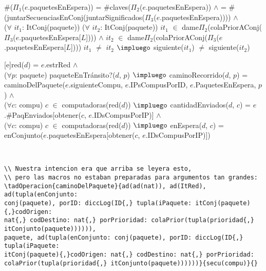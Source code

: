 \begin{Representacion}
{%
    \#($\Pi_1$($e$.paquetesEnEspera)) = \#claves($\Pi_2$($e$.paquetesEnEspera)) $\land$ = \#(juntarSecuenciasEnConj(juntarSignificados($\Pi_3$($e$.paquetesEnEspera)))) $\land$ \\

    ($\forall$ $it_{1}$: ItConj(paquete)) ($\forall$ $it_{2}$: ItConj(paquete)) $it_{1}$ $\in$ dame$\Pi_{2}$(colaPriorAConj($\Pi_{3}$($e$.paquetesEnEspera[$L$]))) $\land$ $it_{2}$ $\in$ dame$\Pi_{2}$(colaPriorAConj($\Pi_{3}$($e$.paquetesEnEspera[$L$]))) $it_{1}$ $\neq$ $it_{2}$ $\impluego$ siguiente($it_{1}$) $\neq$ siguiente($it_{2}$)
    }\mbox{} %


[e]{red($d$) = $e$.estrRed $\land$ \\

  ($\forall p$: paquete) paqueteEnTr\'ansito?($d$, $p$) $\impluego$ caminoRecorrido($d$, $p$) = caminoDelPaquete($e$.siguienteCompu, $e$.IPsCompusPorID, $e$.PaquetesEnEspera, $p$) $\land$ \\

  ($\forall c$: compu) $c$ $\in$ computadoras(red($d$)) $\impluego$ cantidadEnviados($d$, $c$) = $e$.\#PaqEnviados[obtener($c$, $e$.IDsCompusPorIP)] $\land$ \\

  ($\forall c$: compu) $c$ $\in$ computadoras(red($d$)) $\impluego$ enEspera($d$, $c$) = enConjunto($e$.paquetesEnEspera[obtener($c$, $e$.IDsCompusPorIP)])
}

  ~      


\small\begin{verbatim}
\\ Nuestra intencion era que arriba se leyera esto,
\\ pero las macros no estaban preparadas para argumentos tan grandes:
\tadOperacion{caminoDelPaquete}{ad(ad(nat)), ad(ItRed), ad(tupla(enConjunto:
conj(paquete), porID: diccLog(ID{,} tupla(iPaquete: itConj(paquete){,}codOrigen:
nat{,} codDestino: nat{,} porPrioridad: colaPrior(tupla(prioridad{,} itConjunto(paquete)))))),
paquete, ad(tupla(enConjunto: conj(paquete), porID: diccLog(ID{,} tupla(iPaquete:
itConj(paquete){,}codOrigen: nat{,} codDestino: nat{,} porPrioridad:
colaPrior(tupla(prioridad{,} itConjunto(paquete))))))}{secu(compu)}{}
\end{verbatim}


\end{Representacion}
